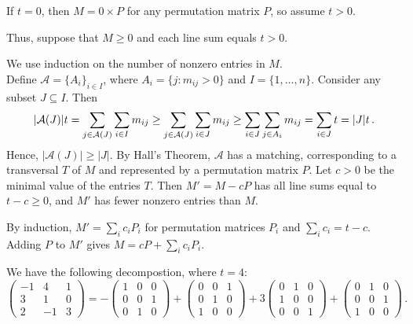\documentclass[a4paper]{article}
\let\oldendproof\endproof
\renewenvironment{proof}[1][\proofname]{%
  \oldproof[\scshape \noindent {\bfseries \text{Proof}}]%
}{\oldendproof}
\newcommand{\example} {\bigskip\noindent{\bf Example.}\;\;}
\newcommand{\Af}{\mathcal{A}}
\begin{document}
{\begin{proof}
If $t = 0$, then $M = 0 \times P$ for any permutation matrix $P$, so assume $t > 0$.

Thus, suppose that $M \geq 0$ and each line sum equals $t > 0$.

We use induction on the number of nonzero entries in $M$.\\
Define $\Af = \{A_i\}_{i \in I}$,
where $A_i = \{j : m_{ij} > 0\}$ and $I = \{1, \ldots, n\}$.
Consider any subset $J \subseteq I$.
Then
\[
       |\Af(J)|t
    =  \sum_{j \in \Af(J)} \sum_{i \in I} m_{ij}\\
  \geq \sum_{j \in \Af(J)} \sum_{i \in J} m_{ij}\\
  \geq \sum_{i \in J} \sum_{j \in A_i} m_{ij}\\
	=  \sum_{i \in J} t\\
	=  |J| t\,.
\]
Hence, $|\Af(J)| \geq |J|$.
By Hall's Theorem, $\Af$ has a matching,
corresponding to a transversal $T$ of $M$
and represented by a permutation matrix $P$.
Let $c > 0$ be the minimal value of the entries $T$.
Then $M' = M -cP$ has all line sums equal to $t - c \geq 0$,
and $M'$ has fewer nonzero entries than $M$.

By induction, $M' = \sum_i c_i P_i$ for permutation matrices $P_i$
and $\sum_i c_i = t-c$.
Adding $P$ to $M'$ gives $M = cP + \sum_i c_i P_i$.
\end{proof}

\example
We have the following decompostion, where $t = 4$:
	\[ \begin{pmatrix}
		-1 & 4 & 1 \\ 3 & 1 & 0 \\ 2 & -1 & 3
	\end{pmatrix} = -\begin{pmatrix}
		1 & 0 & 0 \\ 0 & 0 & 1 \\ 0 & 1 & 0
	\end{pmatrix} + \begin{pmatrix}
		0 & 0 & 1\\ 0 & 1 & 0 \\ 1 & 0 & 0
	\end{pmatrix} + 3 \begin{pmatrix}
		0 & 1 & 0 \\ 1 & 0 & 0 \\ 0 & 0 & 1
	\end{pmatrix} + \begin{pmatrix}
		0 & 1 & 0 \\ 0 & 0 & 1 \\ 1 & 0 & 0
	\end{pmatrix}\,.\]

}
\end{document}
